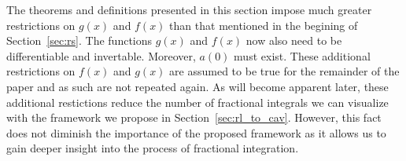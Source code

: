 \documentclass[twoside,reqno,11pt]{fcaa-var} %
\begin{document}
\noindent
The theorems and definitions presented in this section impose much greater restrictions on $g(x)$ and $f(x)$ than that mentioned in the begining of Section~\ref{sec:rs}. The functions $g(x)$ and $f(x)$ now also need to be differentiable and invertable. Moreover, $a(0)$ must exist. These additional restrictions on $f(x)$ and $g(x)$ are assumed to be true for the remainder of the paper and as such are not repeated again. As will become apparent later, these additional restictions reduce the number of fractional integrals we can visualize with the framework we propose in Section~\ref{sec:rl_to_cav}. However, this fact does not diminish the importance of the proposed framework as it allows us to gain deeper insight into the process of fractional integration.

\end{document}
